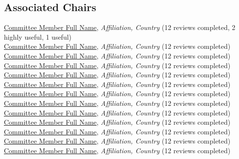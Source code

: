 \subsection{Associated Chairs}
\href{https://orcid.org/0000-0001-2345-6789}{Committee Member Full Name}, \emph{Affiliation, Country} (12 reviews completed, 2 highly useful, 1 useful)\\
\href{https://orcid.org/0000-0001-2345-6789}{Committee Member Full Name}, \emph{Affiliation, Country} (12 reviews completed)\\
\href{https://orcid.org/0000-0001-2345-6789}{Committee Member Full Name}, \emph{Affiliation, Country} (12 reviews completed)\\
\href{https://orcid.org/0000-0001-2345-6789}{Committee Member Full Name}, \emph{Affiliation, Country} (12 reviews completed)\\
\href{https://orcid.org/0000-0001-2345-6789}{Committee Member Full Name}, \emph{Affiliation, Country} (12 reviews completed)\\
\href{https://orcid.org/0000-0001-2345-6789}{Committee Member Full Name}, \emph{Affiliation, Country} (12 reviews completed)\\
\href{https://orcid.org/0000-0001-2345-6789}{Committee Member Full Name}, \emph{Affiliation, Country} (12 reviews completed)\\
\href{https://orcid.org/0000-0001-2345-6789}{Committee Member Full Name}, \emph{Affiliation, Country} (12 reviews completed)\\
\href{https://orcid.org/0000-0001-2345-6789}{Committee Member Full Name}, \emph{Affiliation, Country} (12 reviews completed)\\
\href{https://orcid.org/0000-0001-2345-6789}{Committee Member Full Name}, \emph{Affiliation, Country} (12 reviews completed)\\
\href{https://orcid.org/0000-0001-2345-6789}{Committee Member Full Name}, \emph{Affiliation, Country} (12 reviews completed)\\
\href{https://orcid.org/0000-0001-2345-6789}{Committee Member Full Name}, \emph{Affiliation, Country} (12 reviews completed)\\
\href{https://orcid.org/0000-0001-2345-6789}{Committee Member Full Name}, \emph{Affiliation, Country} (12 reviews completed)\\

